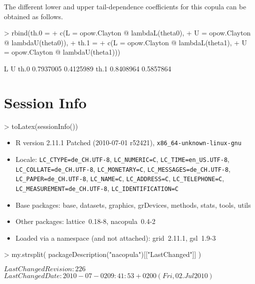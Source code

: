 \documentclass[nojss,article]{jss}
\theoremstyle{mythmstyle}
\begin{document}
The different lower and upper tail-dependence coefficients for this copula can
be obtained as follows.
\begin{Schunk}
\begin{Sinput}
> rbind(th.0 =
+       c(L = opow.Clayton @ lambdaL(theta0),
+         U = opow.Clayton @ lambdaU(theta0)),
+       th.1 =
+       c(L = opow.Clayton @ lambdaL(theta1),
+         U = opow.Clayton @ lambdaU(theta1)))
\end{Sinput}
\begin{Soutput}
             L         U
th.0 0.7937005 0.4125989
th.1 0.8408964 0.5857864
\end{Soutput}
\end{Schunk}


\section{Session Info}

\begin{Schunk}
\begin{Sinput}
> toLatex(sessionInfo())
\end{Sinput}
\begin{itemize}\raggedright
  \item R version 2.11.1 Patched (2010-07-01 r52421), \verb|x86_64-unknown-linux-gnu|
  \item Locale: \verb|LC_CTYPE=de_CH.UTF-8|, \verb|LC_NUMERIC=C|, \verb|LC_TIME=en_US.UTF-8|, \verb|LC_COLLATE=de_CH.UTF-8|, \verb|LC_MONETARY=C|, \verb|LC_MESSAGES=de_CH.UTF-8|, \verb|LC_PAPER=de_CH.UTF-8|, \verb|LC_NAME=C|, \verb|LC_ADDRESS=C|, \verb|LC_TELEPHONE=C|, \verb|LC_MEASUREMENT=de_CH.UTF-8|, \verb|LC_IDENTIFICATION=C|
  \item Base packages: base, datasets, graphics, grDevices,
    methods, stats, tools, utils
  \item Other packages: lattice~0.18-8, nacopula~0.4-2
  \item Loaded via a namespace (and not attached):
    grid~2.11.1, gsl~1.9-3
\end{itemize}\end{Schunk}
\begin{Schunk}
\begin{Sinput}
> my.strsplit(  packageDescription("nacopula")[["LastChanged"]]  )
\end{Sinput}
\end{Schunk}
\begin{Schunk}
\begin{Soutput}
$LastChangedRevision: 226 $
$LastChangedDate: 2010-07-02 09:41:53 +0200 (Fri, 02. Jul 2010) $
\end{Soutput}
\end{Schunk}
\end{document}
